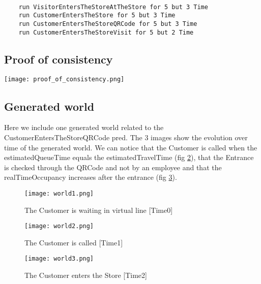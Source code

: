 \begin{lstlisting}[language=alloy]
    
    run VisitorEntersTheStoreAtTheStore for 5 but 3 Time
    run CustomerEntersTheStore for 5 but 3 Time
    run CustomerEntersTheStoreQRCode for 5 but 3 Time
    run CustomerEntersTheStoreVisit for 5 but 2 Time

\end{lstlisting}

\subsection{Proof of consistency}

    \begin{center}
        \texttt{[image: proof\_of\_consistency.png]}
    \end{center}

\subsection{Generated world}
Here we include one generated world related to the CustomerEntersTheStoreQRCode pred. The 3 images show the evolution over time of the generated world. We can notice that the Customer is called when the estimatedQueueTime equals the estimatedTravelTime (fig \ref{world2}), that the Entrance is checked through the QRCode and not by an employee and that the realTimeOccupancy increases after the entrance (fig \ref{world3}).  

    \begin{figure}[H]
        \centering
        \texttt{[image: world1.png]}
        \caption{The Customer is waiting in virtual line [Time0]}\label{world1}
    \end{figure}
    \begin{figure}
        \centering
        \texttt{[image: world2.png]}
        \caption{The Customer is called [Time1]}\label{world2}
    \end{figure}
    \begin{figure}
        \centering
        \texttt{[image: world3.png]}
        \caption{The Customer enters the Store [Time2]}\label{world3}
    \end{figure}